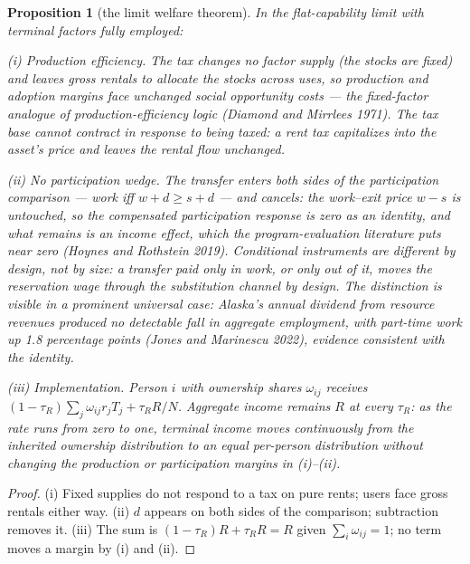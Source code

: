 \documentclass[12pt]{article}
\theoremstyle{plain}
\newtheorem{proposition}{Proposition}
\begin{document}
\begin{proposition}[the limit welfare theorem]\label{prop:welfare}
In the flat-capability limit with terminal factors fully employed:

(i) \emph{Production efficiency.} The tax changes no factor supply (the stocks are fixed) and leaves gross rentals to allocate the stocks across uses, so production and adoption margins face unchanged social opportunity costs --- the fixed-factor analogue of production-efficiency logic (Diamond and Mirrlees 1971). The tax base cannot contract in response to being taxed: a rent tax capitalizes into the asset's price and leaves the rental flow unchanged.

(ii) \emph{No participation wedge.} The transfer enters both sides of the participation comparison --- work iff $w + d \ge s + d$ --- and cancels: the work--exit price $w - s$ is untouched, so the compensated participation response is zero as an identity, and what remains is an income effect, which the program-evaluation literature puts near zero (Hoynes and Rothstein 2019). Conditional instruments are different by design, not by size: a transfer paid only in work, or only out of it, moves the reservation wage through the substitution channel by design. The distinction is visible in a prominent universal case: Alaska's annual dividend from resource revenues produced no detectable fall in aggregate employment, with part-time work up 1.8 percentage points (Jones and Marinescu 2022), evidence consistent with the identity.

(iii) \emph{Implementation.} Person $i$ with ownership shares $\omega _{ij}$ receives $(1-\tau _R)\sum _j\omega _{ij}r_jT_j+\tau _RR/N$. Aggregate income remains $R$ at every $\tau _R$: as the rate runs from zero to one, terminal income moves continuously from the inherited ownership distribution to an equal per-person distribution without changing the production or participation margins in (i)--(ii).
\end{proposition}

\begin{proof}
(i) Fixed supplies do not respond to a tax on pure rents; users face gross rentals either way. (ii) $d$ appears on both sides of the comparison; subtraction removes it. (iii) The sum is $(1-\tau _R)R + \tau _R R = R$ given $\sum _i\omega _{ij} = 1$; no term moves a margin by (i) and (ii).
\end{proof}
\end{document}
